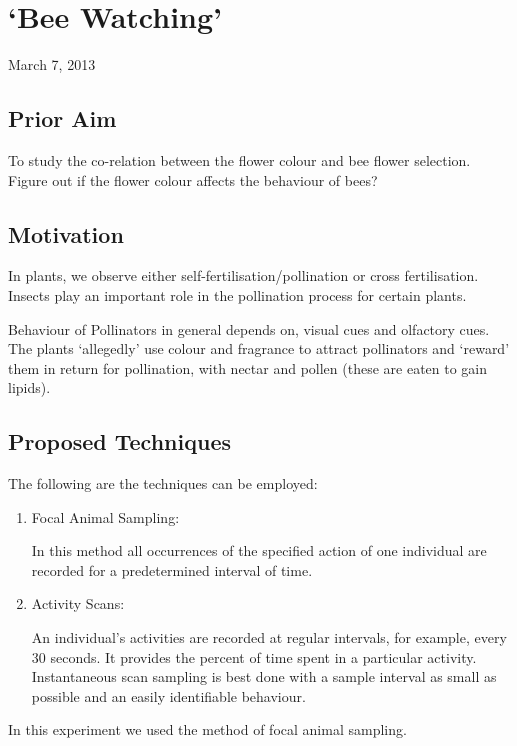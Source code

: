 \chapter{`Bee Watching'}
\begin{flushright}
March 7, 2013
\end{flushright}
\section{Prior Aim}
	To study the co-relation between the flower colour and bee flower selection. Figure out if the flower colour affects the behaviour of bees?
\section{Motivation}	
	In plants, we observe either self-fertilisation/pollination or cross fertilisation. Insects play an important role in the pollination process for certain plants.
	\par
	Behaviour of Pollinators in general depends on, visual cues and olfactory cues. The plants `allegedly' use colour and fragrance to attract pollinators and `reward' them in return for pollination, with nectar and pollen (these are eaten to gain lipids).

\section{Proposed Techniques}
	The following are the techniques can be employed:
	\begin{enumerate}
		\item Focal Animal Sampling: \par
		In this method all occurrences of the specified action of one individual are recorded for a predetermined interval of time.
		\item Activity Scans: \par
		An individual's activities are recorded at regular intervals, for example, every 30 seconds.
		It provides the percent of time spent in a particular activity. Instantaneous scan sampling is best done with a sample interval as small as possible and an easily identifiable behaviour. 		
	\end{enumerate}
	In this experiment we used the method of focal animal sampling.



